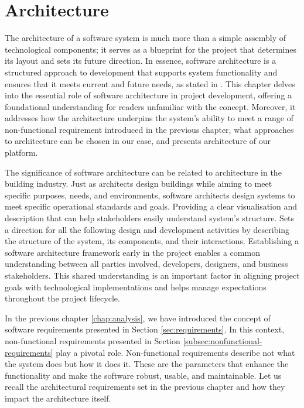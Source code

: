 \chapter{Architecture}
\label{chap:architectural-design}
The architecture of a software system is much more than a simple assembly of technological components; it serves as a blueprint for the project that determines its layout and sets its future direction.
In essence, software architecture is a structured approach to development that supports system functionality and ensures that it meets current and future needs, as stated in \cite{sommervilleSW}.
This chapter delves into the essential role of software architecture in project development, offering a foundational understanding for readers unfamiliar with the concept.
Moreover, it addresses how the architecture underpins the system’s ability to meet a range of non-functional requirement introduced in the previous chapter, what approaches to architecture can be chosen in our case, and presents architecture of our platform.

The significance of software architecture can be related to architecture in the building industry.
Just as architects design buildings while aiming to meet specific purposes, needs, and environments, software architects design systems to meet specific operational standards and goals.
Providing a clear visualisation and description that can help stakeholders easily understand system's structure.
Sets a direction for all the following design and development activities by describing the structure of the system, its components, and their interactions.
Establishing a software architecture framework early in the project enables a common understanding between all parties involved, developers, designers, and business stakeholders.
This shared understanding is an important factor in aligning project goals with technological implementations and helps manage expectations throughout the project lifecycle.



In the previous chapter \ref{chap:analysis}, we have introduced the concept of software requirements presented in Section \ref{sec:requirements}.
In this context, non-functional requirements presented in Section \ref{subsec:nonfunctional-requirements} play a pivotal role.
Non-functional requirements describe not what the system does but how it does it.
These are the parameters that enhance the functionality and make the software robust, usable, and maintainable.
Let us recall the architectural requirements set in the previous chapter and how they impact the architecture itself.

